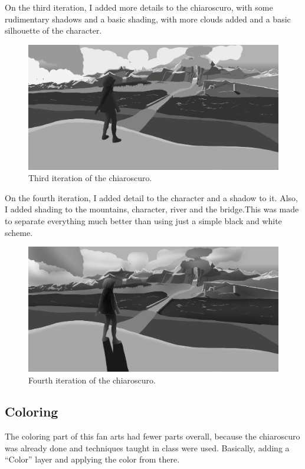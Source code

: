 \documentclass{cup-pan}
\begin{document}
        On the third iteration, I added more details to the chiaroscuro, with some rudimentary shadows and a basic shading, with more clouds added and a basic silhouette of the character.\\
        \begin{figure}[H]
            \includegraphics[width=\textwidth]{Imagenes/Fanart1/Claroscuro/Imagen3.png}
            \caption{Third iteration of the chiaroscuro.}
        \end{figure}

        On the fourth iteration, I added detail to the character and a shadow to it. Also, I added shading to the mountains, character, river and the bridge.This was made to separate everything much better than using just a simple black and white scheme.\\
        \begin{figure}[H]
            \includegraphics[width=\textwidth]{Imagenes/Fanart1/Claroscuro/Imagen4.png}
            \caption{Fourth iteration of the chiaroscuro.}
        \end{figure}

    \subsection{Coloring}
        The coloring part of this fan arts had fewer parts overall, because the chiaroscuro was already done and techniques taught in class were used. Basically, adding a “Color” layer and applying the color from there.\\
\end{document}
